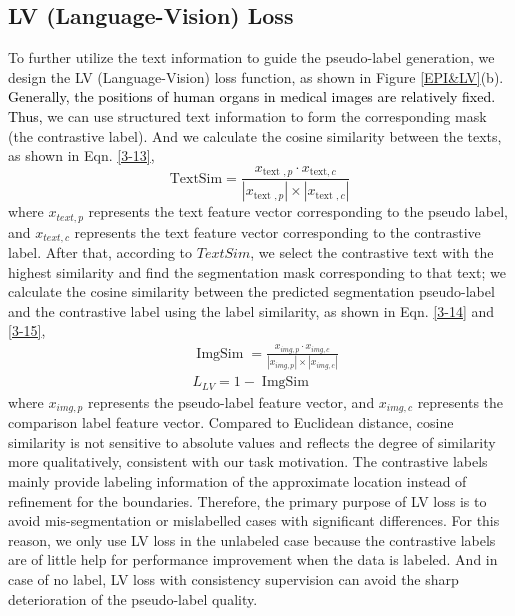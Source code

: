 \documentclass[lettersize,journal]{IEEEtran}
\begin{document}
\subsection{LV (Language-Vision) Loss}
To further utilize the text information to guide the pseudo-label generation, we design the LV (Language-Vision) loss function, as shown in Figure \ref{EPI&LV}(b). \textcolor{black}{
Generally, the positions of human organs in medical images are relatively fixed. Thus,} we can use structured text information to form the corresponding mask (the contrastive label). And we calculate the cosine similarity between the texts, as shown in Eqn. \ref{3-13},
\begin{equation}
    \text {TextSim}=\frac{x_{\text {text }, p} \cdot x_{\text {text}, c}}{\left|x_{\text {text }, p}\right| \times\left|x_{\text {text }, c}\right|}
    \label{3-13}
\end{equation}
where $x_{text,p}$ represents the text feature vector corresponding to the pseudo label, and $x_{text,c}$ represents the text feature vector corresponding to the contrastive label. After that, according to $TextSim$, we select the contrastive text with the highest similarity and find the segmentation mask corresponding to that text; we calculate the cosine similarity between the predicted segmentation pseudo-label and the contrastive label using the label similarity, as shown in Eqn. \ref{3-14} and \ref{3-15},
\begin{eqnarray}
    &\operatorname{ImgSim}=\frac{x_{img, p} \cdot x_{img,c}}{\left|x_{img,p}\right| \times\left|x_{img,c}\right|}
    \label{3-14}
    \\
    &L_{LV}=1-\operatorname{ImgSim}
    \label{3-15}
\end{eqnarray}
where $x_{img,p}$ represents the pseudo-label feature vector, and $x_{img,c}$ represents the comparison label feature vector. Compared to Euclidean distance, cosine similarity is not sensitive to absolute values and reflects the degree of similarity more qualitatively, consistent with our task motivation. The contrastive labels mainly provide labeling information of the approximate location instead of refinement for the boundaries. Therefore, the primary purpose of LV loss is to avoid mis-segmentation or mislabelled cases with significant differences. For this reason, we only use LV loss in the unlabeled case because the contrastive labels are of little help for performance improvement when the data is labeled. And in case of no label, LV loss with consistency supervision can avoid the sharp deterioration of the pseudo-label quality.
\end{document}
